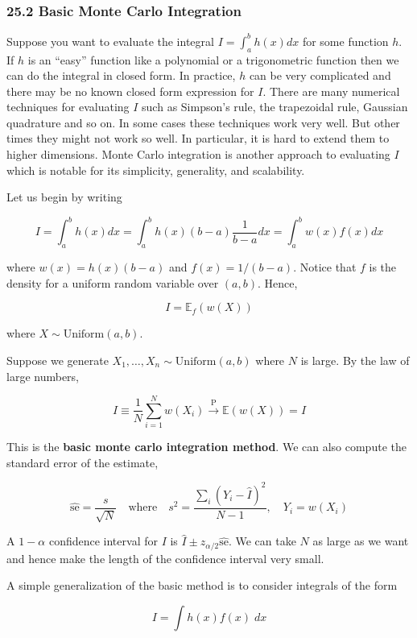 \subsubsection{25.2 Basic Monte Carlo Integration}\label{basic-monte-carlo-integration}

Suppose you want to evaluate the integral \(I = \int_a^b h(x) dx\) for
some function \(h\). If \(h\) is an ``easy'' function like a polynomial
or a trigonometric function then we can do the integral in closed form.
In practice, \(h\) can be very complicated and there may be no known
closed form expression for \(I\). There are many numerical techniques
for evaluating \(I\) such as Simpson's rule, the trapezoidal rule,
Gaussian quadrature and so on. In some cases these techniques work very
well. But other times they might not work so well. In particular, it is
hard to extend them to higher dimensions. Monte Carlo integration is
another approach to evaluating \(I\) which is notable for its
simplicity, generality, and scalability.

Let us begin by writing

\[ I = \int_a^b h(x) dx = \int_a^b h(x) (b - a) \frac{1}{b - a} dx = \int_a^b w(x) f(x) dx\]

where \(w(x) = h(x)(b - a)\) and \(f(x) = 1 / (b - a)\). Notice that
\(f\) is the density for a uniform random variable over \((a, b)\).
Hence,

\[ I = \mathbb{E}_f(w(X)) \]

where \(X \sim \text{Uniform}(a, b)\).

Suppose we generate \(X_1, \dots, X_n \sim \text{Uniform}(a, b)\) where
\(N\) is large. By the law of large numbers,

\[ \hat{I} \equiv \frac{1}{N} \sum_{i=1}^N w(X_i) \xrightarrow{\text{P}} \mathbb{E}(w(X)) = I \]

This is the \textbf{basic monte carlo integration method}. We can also
compute the standard error of the estimate,

\[ \hat{\text{se}} = \frac{s}{\sqrt{N}} 
\quad \text{where} \quad
s^2 = \frac{\sum_i (Y_i - \hat{I})^2}{N - 1},
\quad Y_i = w(X_i)
\]

A \(1 - \alpha\) confidence interval for \(I\) is
\(\hat{I} \pm z_{\alpha / 2} \hat{\text{se}}\). We can take \(N\) as
large as we want and hence make the length of the confidence interval
very small.

A simple generalization of the basic method is to consider integrals of
the form

\[ I = \int h(x) f(x) \; dx \]


